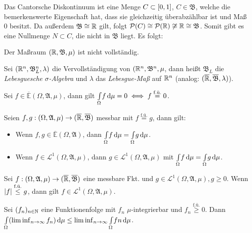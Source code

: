 \documentclass{cheat-sheet}
\newcommand{\PS}{\mathcal{P}} %
\newcommand{\Alg}{\mathfrak{A}} %
\newcommand{\Bor}{\mathfrak{B}} %
\newcommand{\E}{\mathbb{E}} %
\newcommand{\Leb}{\mathcal{L}} %
\newcommand{\fue}{\overset{\text{f.ü.}}} %
\theoremstyle{definition}
\newcommand{\IntOmu}[1]{\Int{\Omega}{}{#1}{\mu}} %
\begin{document}

\begin{bem}
  Das Cantorsche Diskontinuum ist eine Menge $C \subset \left[ 0, 1 \right]$, $C \in \Bor$, welche die bemerkenswerte Eigenschaft hat, dass sie gleichzeitig überabzählbar ist und Maß $0$ besitzt. Da außerdem $\Bor \cong \R$ gilt, folgt $\PS(C) \cong \PS(\R) \not\cong \R \cong \Bor$. Somit gibt es eine Nullmenge $N \subset C$, die nicht in $\Bor$ liegt. Es folgt:
\end{bem}

\begin{satz}
  Der Maßraum $(\R, \Bor, \mu)$ ist nicht vollständig.
\end{satz}

\begin{defn}
  Sei $(\R^n, \Bor_L^n, \lambda)$ die Vervollständigung von $(\R^n, \Bor^n, \mu$, dann heißt $\Bor_L$ die \emph{Lebesguesche $\sigma$-Algebra} und $\lambda$ das \emph{Lebesgue-Maß} auf $\mathbb{R}^n$ (analog: $(\ER, \overline{\Bor}, \lambda)$).
\end{defn}

\begin{satz}
  Sei $f \in \overline{\E}(\Omega, \Alg, \mu)$, dann gilt $\IntOmu{f} = 0 \iff f \overset{\text{f.ü.}}= 0$.
\end{satz}

\vspace{-10pt}

\begin{satz}
  Seien $f, g : (\Omega, \Alg, \mu) \to (\ER, \overline{\Bor})$ messbar mit $f \fue= g$, dann gilt:
  \begin{itemize}
    \item Wenn $f, g \in \overline{\E}(\Omega, \Alg)$, dann $\IntOmu{f} = \IntOmu{g}$.
    \item Wenn $f \in \Leb^1(\Omega, \Alg, \mu)$, dann $g \in \Leb^1(\Omega, \Alg, \mu)$ mit $\IntOmu{f} = \IntOmu{g}$.
  \end{itemize}
\end{satz}

\begin{satz}
  Sei $f : (\Omega, \Alg, \mu) \to (\ER, \overline{\Bor})$ eine messbare Fkt. und $g \in \Leb^1(\Omega, \Alg, \mu), g \geq 0$. Wenn $\abs{f} \fue\leq g$, dann gilt $f \in \Leb^1(\Omega, \Alg, \mu)$.
\end{satz}


\begin{lem}\begin{doublespace}
  Sei $(f_n)_{n \in \mathbb{N}}$ eine Funktionenfolge mit $f_n$ $\mu$-integrierbar und $f_n \overset{\text{f.ü.}}\geq 0$. Dann $\IntOmu{(\liminf_{n \to \infty} f_n)} \leq \liminf_{n \to \infty} \IntOmu{fn}$.
\end{doublespace}\end{lem}
\end{document}
